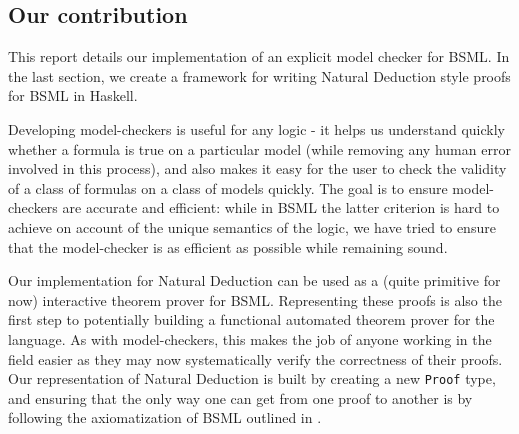 \subsection{Our contribution}

This report details our implementation of an explicit model checker for BSML.
In the last section, we create a framework for writing Natural Deduction style
proofs for BSML in Haskell.

Developing model-checkers is useful for any logic - it helps us understand quickly whether a formula is true on a particular model (while removing any human
error involved in this process), and also makes it easy for the user to check the validity of a class of formulas on a class of models quickly.
The goal is to ensure model-checkers are accurate and efficient: while in BSML the latter criterion is hard to achieve on account of the unique
semantics of the logic, we have tried to ensure that the model-checker is as efficient as possible while remaining sound.

Our implementation for Natural Deduction can be used as a (quite primitive for now) interactive theorem prover for BSML.
Representing these proofs is also the first step to potentially building a functional automated theorem prover for the language. As with model-checkers, this makes the
job of anyone working in the field easier as they may now systematically verify the correctness of their proofs. Our representation of Natural Deduction is built by creating a new \verb|Proof| type, and ensuring that the only
way one can get from one proof to another is by following the axiomatization of BSML outlined in \cite{Aloni2024}.
​